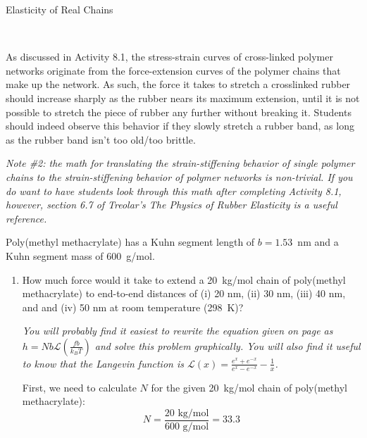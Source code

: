\begin{activity}[extension]{Elasticity of Real Chains}
\begin{exercises}
\begin{solution}{}
			~
			
			
			As discussed in Activity 8.1, the stress-strain curves of cross-linked polymer networks originate from the force-extension curves of the polymer chains that make up the network.  As such, the force it takes to stretch a crosslinked rubber should increase sharply as the rubber nears its maximum extension, until it is not possible to stretch the piece of rubber any further without breaking it.	Students should indeed observe this behavior if they slowly stretch a rubber band, as long as the rubber band isn't too old/too brittle.
			
			\emph{Note \#2: the math for translating the strain-stiffening behavior of single polymer chains to the strain-stiffening behavior of polymer networks is non-trivial.  If you do want to have students look through this math after completing Activity 8.1, however, section 6.7 of  Treolar's \emph{The Physics of Rubber Elasticity} is a useful reference.}
		\end{solution}
		
	
	\exercise Poly(methyl methacrylate) has a Kuhn segment length of $b=1.53$~nm and a Kuhn segment mass of $600$~g/mol.
	
		\begin{enumerate}
			\item How much force would it take to extend a 20~kg/mol chain of poly(methyl methacrylate) to end-to-end distances of (i) 20 nm, (ii) 30 nm, (iii) 40 nm, and and (iv) 50 nm at room temperature (298~K)?
			
				\emph{You will probably find it easiest to rewrite the equation given on page \pageref{\labelbase:eqn:Fdlangevin} as $h = Nb\mathcal{L}\left(\frac{fb}{k_B T}\right)$ and solve this problem graphically.  You will also find it useful to know that the Langevin function is $\mathcal{L}(x)= \frac{e^x + e^{-x}}{e^x - e^{-x}} - \frac{1}{x}$.}
			
				\begin{solution}{}
					First, we need to calculate $N$ for the given 20~kg/mol chain of poly(methyl methacrylate):
					\begin{equation*}
						N = \frac{20\text{ kg/mol}}{600\text{ g/mol}} = 33.3
					\end{equation*}
					

\end{solution}
\end{enumerate}
\end{exercises}
\end{activity}
